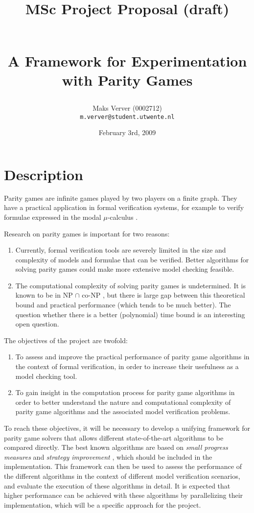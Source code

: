 \documentclass[11pt]{article}
\title{\begin{small}MSc Project Proposal (draft)\end{small}\\
A Framework for Experimentation with Parity Games}
\author{Maks Verver (0002712)\\\texttt{m.verver@student.utwente.nl}}
\date{February 3rd, 2009}
\begin{document}
\maketitle

\section{Description}
Parity games are infinite games played by two players on a finite graph. They
have a practical application in formal verification systems, for example to
verify formulae expressed in the modal $\mu$-calculus \cite{wilke1993}.

Research on parity games is important for two reasons:
\begin{enumerate}
\item Currently, formal verification tools are severely limited in the size and
complexity of models and formulae that can be verified. Better algorithms for
solving parity games could make more extensive model checking feasible.

\item The computational complexity of solving parity games is undetermined. It
is known to be in NP $\cap$ co-NP \cite{emerson2001mcmu}, but there is large gap
between this theoretical bound and practical performance (which tends to be
much better). The question whether there is a better (polynomial) time bound is
an interesting open question.
\end{enumerate}

The objectives of the project are twofold:
\begin{enumerate}
\item To assess and improve the practical performance of parity game algorithms
in the context of formal verification, in order to increase their usefulness as
a model checking tool.
\item To gain insight in the computation process for parity game algorithms in
order to better understand the nature and computational complexity of parity
game algorithms and the associated model verification problems.
\end{enumerate}

To reach these objectives, it will be necessary to develop a unifying framework
for parity game solvers that allows different state-of-the-art algorithms to be
compared directly. The best known algorithms are based on
\emph{small progress measures} \cite{jurdzinski2000spm} and
\emph{strategy improvement} \cite{voge2000dsi} \cite{schewe2008osi}, which
should be included in the implementation.
This framework can then be used to assess the performance of the different algorithms
in the context of different model verification scenarios, and evaluate the
execution of these algorithms in detail. It is expected that higher performance
can be achieved with these algorithms by parallelizing their implementation,
which will be a specific approach for the project.
\end{document}
